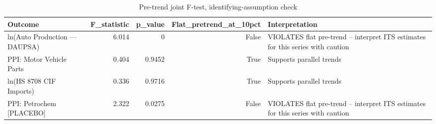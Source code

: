 \begin{table}
\caption{Pre-trend joint F-test, identifying-assumption check}
\label{tab:tableS6_pretrend_ftest}
\begin{tabular}{lrrrl}
\toprule
Outcome & F\_statistic & p\_value & Flat\_pretrend\_at\_10pct & Interpretation \\
\midrule
ln(Auto Production — DAUPSA) & 6.014 & 0 & False & VIOLATES flat pre-trend -- interpret ITS estimates for this series with caution \\
PPI: Motor Vehicle Parts & 0.404 & 0.9452 & True & Supports parallel trends \\
ln(HS 8708 CIF Imports) & 0.336 & 0.9716 & True & Supports parallel trends \\
PPI: Petrochem [PLACEBO] & 2.322 & 0.0275 & False & VIOLATES flat pre-trend -- interpret ITS estimates for this series with caution \\
\bottomrule
\end{tabular}
\end{table}
